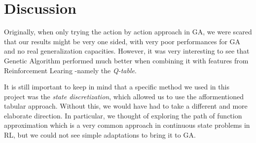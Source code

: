 \section{Discussion}
Originally, when only trying the action by action approach in GA, we were scared that our results might be very one sided, with very poor performances for GA and no real generalization capacities.
However, it was very interesting to see that Genetic Algorithm performed much better when combining it with features from Reinforcement Learing -namely the \textit{Q-table}.

It is still important to keep in mind that a specific method we used in this project was the \textit{state discretization}, which allowed us to use the afformentioned tabular approach.
Without this, we would have had to take a different and more elaborate direction. In particular, we thought of exploring the path of function approximation which is a very common approach in continuous state problems in RL, but we could not see simple adaptations to bring it to GA.
